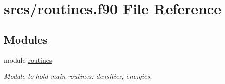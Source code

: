\hypertarget{routines_8f90}{}\section{srcs/routines.f90 File Reference}
\label{routines_8f90}
\subsection*{Modules}
\begin{DoxyCompactItemize}
\item 
module \mbox{\hyperlink{namespaceroutines}{routines}}
\begin{DoxyCompactList}\small\item\em Module to hold main routines\+: densities, energies. \end{DoxyCompactList}\end{DoxyCompactItemize}
